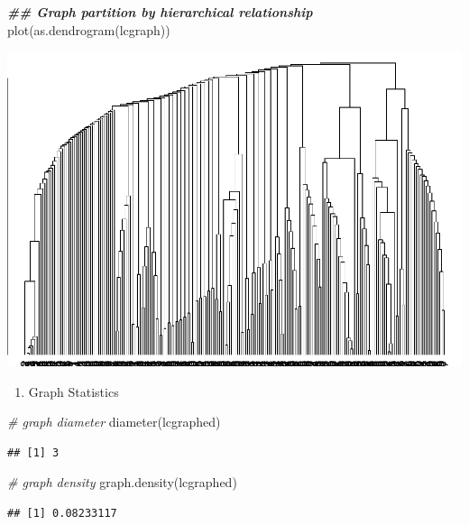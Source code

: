 \documentclass[
]{article}
\newenvironment{Shaded}{\begin{snugshade}}{\end{snugshade}}
\newcommand{\CommentTok}[1]{\textcolor[rgb]{0.56,0.35,0.01}{\textit{#1}}}
\newcommand{\DocumentationTok}[1]{\textcolor[rgb]{0.56,0.35,0.01}{\textbf{\textit{#1}}}}
\newcommand{\FunctionTok}[1]{\textcolor[rgb]{0.00,0.00,0.00}{#1}}
\newcommand{\NormalTok}[1]{#1}
\providecommand{\tightlist}{%
  \setlength{\itemsep}{0pt}\setlength{\parskip}{0pt}}
\begin{document}
\begin{Shaded}
\begin{Highlighting}[]
\DocumentationTok{\#\# Graph partition by hierarchical relationship}
\FunctionTok{plot}\NormalTok{(}\FunctionTok{as.dendrogram}\NormalTok{(lcgraph)) }
\end{Highlighting}
\end{Shaded}

\includegraphics{SMI-Project-2022_files/figure-latex/unnamed-chunk-3-4.pdf}

\begin{enumerate}
\def\labelenumi{\arabic{enumi}.}
\setcounter{enumi}{2}
\tightlist
\item
  Graph Statistics
\end{enumerate}

\begin{Shaded}
\begin{Highlighting}[]
\CommentTok{\# graph diameter}
\FunctionTok{diameter}\NormalTok{(lcgraphed)}
\end{Highlighting}
\end{Shaded}

\begin{verbatim}
## [1] 3
\end{verbatim}

\begin{Shaded}
\begin{Highlighting}[]
\CommentTok{\# graph density}
\FunctionTok{graph.density}\NormalTok{(lcgraphed)}
\end{Highlighting}
\end{Shaded}

\begin{verbatim}
## [1] 0.08233117
\end{verbatim}
\end{document}
